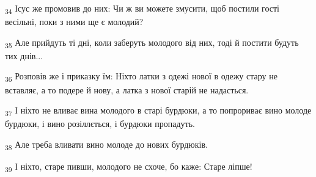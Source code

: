 \begin{tcolorbox}
\textsubscript{34} Ісус же промовив до них: Чи ж ви можете змусити, щоб постили гості весільні, поки з ними ще є молодий?
\end{tcolorbox}
\begin{tcolorbox}
\textsubscript{35} Але прийдуть ті дні, коли заберуть молодого від них, тоді й постити будуть тих днів...
\end{tcolorbox}
\begin{tcolorbox}
\textsubscript{36} Розповів же і приказку їм: Ніхто латки з одежі нової в одежу стару не вставляє, а то подере й нову, а латка з нової старій не надасться.
\end{tcolorbox}
\begin{tcolorbox}
\textsubscript{37} І ніхто не вливає вина молодого в старі бурдюки, а то попрориває вино молоде бурдюки, і вино розіллється, і бурдюки пропадуть.
\end{tcolorbox}
\begin{tcolorbox}
\textsubscript{38} Але треба вливати вино молоде до нових бурдюків.
\end{tcolorbox}
\begin{tcolorbox}
\textsubscript{39} І ніхто, старе пивши, молодого не схоче, бо каже: Старе ліпше!
\end{tcolorbox}
